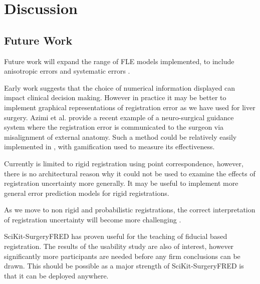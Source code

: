 \section{Discussion}
\subsection{Future Work}
Future work will expand the range of \gls{FLE} models implemented, to include anisotropic \cite{4359072} 
errors and systematic errors \cite{6294449}. 

Early work suggests that the choice of numerical information displayed can impact 
clinical decision making. However in practice it may be better to implement 
graphical representations of registration error as we have used for 
liver surgery\cite{PMID:29663273}. Azimi et al. \cite{10.1007/978-3-030-59716-0_7} 
provide a recent example of a neuro-surgical guidance system where the 
registration error is communicated to the surgeon via misalignment of 
external anatomy. Such a method could be relatively easily implemented in \fred, with
gamification used to measure its effectiveness. 

Currently \fred is limited to rigid registration using point correspondence, however, 
there is no architectural reason why it could not be used to examine the 
effects of registration uncertainty more generally. It may be useful to implement 
more general error prediction models for rigid registrations\cite{4359072,5629373}.

As we move to non rigid and 
probabilistic registrations, the correct interpretation of registration 
uncertainty will become more challenging \cite{10.1007/978-3-030-59716-0_26}.

SciKit-SurgeryFRED has proven useful for the teaching of fiducial based registration. The results of the usability study 
are also of interest, however significantly more participants are needed before any firm conclusions can be drawn. This 
should be possible as a major strength of SciKit-SurgeryFRED is that it can be deployed anywhere. 








